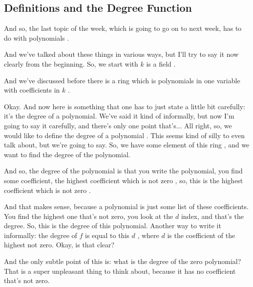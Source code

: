 \subsection{Definitions and the Degree Function}

\begin{speech}[00:22:20 - 00:23:46]
And so, the last topic of the week, which is going to go on to next week, has to do with polynomials .

And we've talked about these things in various ways, but I'll try to say it now clearly from the beginning. So, we start with $k$ is a field .

And we've discussed before there is a ring which is polynomials in one variable  with coefficients in $k$ .

Okay. And now here is something that one has to just state a little bit carefully: it's the degree of a polynomial. We've said it kind of informally, but now I'm going to say it carefully, and there's only one point that's... All right, so, we would like to define the degree of a polynomial . This seems kind of silly to even talk about, but we're going to say. So, we have some element of this ring , and we want to find the degree of the polynomial.
\end{speech}

\begin{hidden}
\end{hidden}

\begin{speech}[00:23:46 - 00:25:16]
And so, the degree of the polynomial is that you write the polynomial, you find some coefficient, the highest coefficient which is not zero , so, this is the highest coefficient  which is not zero .

And that makes sense, because a polynomial is just some list of these coefficients. You find the highest one that's not zero, you look at the $d$ index, and that's the degree. So, this is the degree of this polynomial. Another way to write it informally: the degree of $f$ is equal to this $d$ , where $d$ is the coefficient of the highest not zero. Okay, is that clear?

And the only subtle point of this is: what is the degree of the zero polynomial?  That is a super unpleasant thing to think about, because it has no coefficient that's not zero.
\end{speech}

